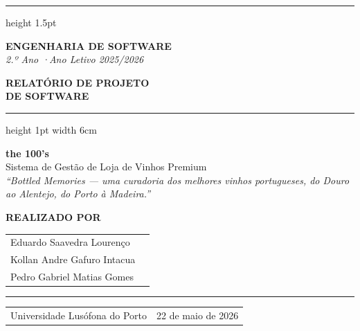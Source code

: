 \documentclass[11pt,a4paper]{report}
\begin{document}
\begin{titlepage}
  \thispagestyle{empty}
  \vspace*{1.8cm}
  {\color{gold}\hrule height 1.5pt}
  \vspace{0.4cm}
  {\sffamily\bfseries\color{burgundy}\large ENGENHARIA DE SOFTWARE}\\[4pt]
  {\sffamily\itshape\color{muted}2.º Ano \quad·\quad Ano Letivo 2025/2026}\\[3cm]

  \begin{center}
    \colorbox{burgundyLight}{\parbox{\dimexpr\textwidth-2cm\relax}{
      \vspace{0.5cm}
      \centering
      {\Huge\bfseries\color{ink}RELATÓRIO DE PROJETO}\\[8pt]
      {\Huge\bfseries\color{ink}DE SOFTWARE}\\
      \vspace{0.5cm}
    }}
  \end{center}

  \vspace{0.4cm}
  {\color{gold}\hrule height 1pt width 6cm}
  \vspace{0.6cm}

  {\LARGE\bfseries\color{burgundy}the 100's}\\[8pt]
  {\Large\color{ink}Sistema de Gestão de Loja de Vinhos Premium}\\[16pt]
  {\itshape\color{muted}``Bottled Memories — uma curadoria dos melhores vinhos portugueses, do Douro ao Alentejo, do Porto à Madeira.''}

  \vfill

  {\sffamily\bfseries\color{burgundy}\normalsize REALIZADO POR}\\[6pt]
  \begin{tabular}{ll}
    Eduardo Saavedra Lourenço \\
    Kollan Andre Gafuro Intacua \\
    Pedro Gabriel Matias Gomes \\
  \end{tabular}
  \vspace{1.2cm}

  \rule{\textwidth}{0.4pt}
  \begin{tabular}{p{}r}
    Universidade Lusófona do Porto & 22 de maio de 2026
  \end{tabular}
\end{titlepage}
\end{document}
